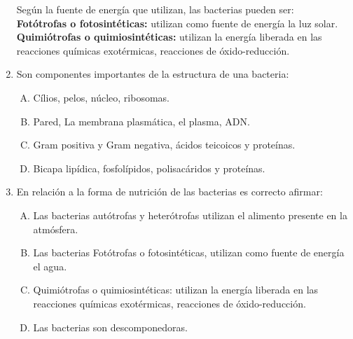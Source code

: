 \begin{enumerate}
Según la fuente de energía que utilizan, las bacterias pueden ser:\\

\textbf{Fotótrofas o fotosintéticas:} utilizan como fuente de energía la luz solar.\\

\textbf{Quimiótrofas o quimiosintéticas:} utilizan la energía liberada en las reacciones químicas exotérmicas, reacciones de óxido-reducción.


\newpage
\item Son componentes importantes de la estructura de una bacteria:\label{bio-26}


\begin{enumerate}[(A)]
\item Cílios, pelos, núcleo, ribosomas.
\item Pared, La membrana plasmática, el plasma, ADN.
\item Gram positiva y Gram negativa, ácidos teicoicos y proteínas.
\item Bicapa lipídica, fosfolípidos, polisacáridos y proteínas.
\end{enumerate}


\newpage
\item En relación a la forma de nutrición de las bacterias es correcto afirmar: \label{bio-27}


\begin{enumerate}[(A)]
\item Las bacterias autótrofas y heterótrofas utilizan el alimento presente en la atmósfera.
\item  Las bacterias Fotótrofas o fotosintéticas,  utilizan como fuente de energía el agua.
\item  Quimiótrofas o quimiosintéticas: utilizan la energía liberada en las reacciones químicas      exotérmicas, reacciones de óxido-reducción.
\item  Las bacterias son descomponedoras.
\end{enumerate}

\end{enumerate}
